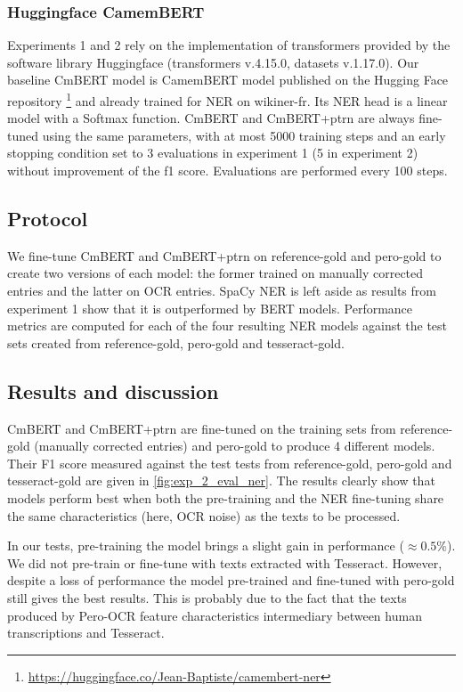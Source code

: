\subsubsection{Huggingface CamemBERT}

Experiments 1 and 2 rely on the implementation of transformers provided by the software library Huggingface (transformers v.4.15.0, datasets v.1.17.0).
Our baseline CmBERT model is CamemBERT model published on the Hugging Face repository \footnote{\url{https://huggingface.co/Jean-Baptiste/camembert-ner}} and already trained for NER on wikiner-fr.
Its NER head is a linear model with a Softmax function.
CmBERT and CmBERT+ptrn are always fine-tuned using the same parameters, with at most 5000 training steps and an early stopping condition set to 3 evaluations in experiment 1 (5 in experiment 2) without improvement of the f1 score. Evaluations are performed every 100 steps.

\subsection{Protocol}

We fine-tune CmBERT and CmBERT+ptrn on reference-gold and pero-gold to create two versions of each model: the former trained on manually corrected entries and the latter on OCR entries.
SpaCy NER is left aside as results from experiment 1 show that it is outperformed by BERT models.
Performance metrics are computed for each of the four resulting NER models against the test sets created from reference-gold, pero-gold and tesseract-gold.


\subsection{Results and discussion}


CmBERT and CmBERT+ptrn are fine-tuned on the training sets from reference-gold (manually corrected entries) and pero-gold to produce 4 different models.
Their F1 score measured against the test tests from reference-gold, pero-gold and tesseract-gold are given in \cref{fig:exp_2_eval_ner}.
The results clearly show that models perform best when both the pre-training and the NER fine-tuning share the same characteristics (here, OCR noise) as the texts to be processed.

In our tests, pre-training the model brings a slight gain in performance ($\approx 0.5\%$).
We did not pre-train or fine-tune with texts extracted with Tesseract.
However, despite a loss of performance the model pre-trained and fine-tuned with pero-gold still gives the best results.
This is probably due to the fact that the texts produced by Pero-OCR feature characteristics intermediary between human transcriptions and Tesseract.

